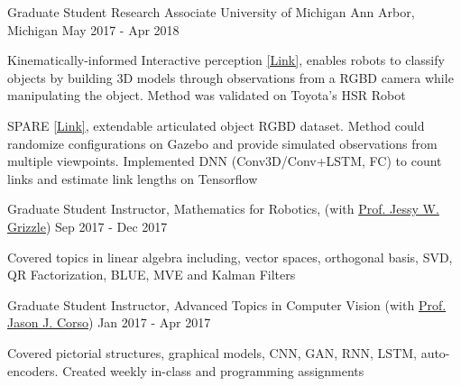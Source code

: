 

\begin{cventries2}
\cventry
{Graduate Student Research Associate} %
{University of Michigan} %
{Ann Arbor, Michigan} %
{May 2017 - Apr 2018} %
{
	\begin{cvitems} %
		\item {Kinematically-informed Interactive perception \href{https://arxiv.org/pdf/1901.05580}{[Link]}, enables robots to classify objects by building 3D models through observations from a RGBD camera while manipulating the object. Method was validated on Toyota’s HSR Robot}
		\vspace{0.1cm}
		\item SPARE {\href{https://arxiv.org/pdf/1803.11147}{[Link]}, extendable articulated object RGBD dataset. Method could randomize configurations on Gazebo and provide simulated observations from multiple viewpoints. Implemented DNN (Conv3D/Conv+LSTM, FC) to count links and estimate link lengths on Tensorflow}
	\end{cvitems}
}

\cventry
{Graduate Student Instructor, Mathematics for Robotics, (with \href{https://ece.umich.edu/faculty/grizzle/}{Prof. Jessy W. Grizzle})} %
{} %
{} %
{Sep 2017 - Dec 2017} %
{
	\begin{cvitems} %
		\item {Covered topics in linear algebra including, vector spaces, orthogonal basis, SVD, QR Factorization, BLUE, MVE and Kalman Filters}
	\end{cvitems}
}
\cventry
{Graduate Student Instructor, Advanced Topics in Computer Vision (with \href{https://web.eecs.umich.edu/~jjcorso/}{Prof. Jason J. Corso})} %
{} %
{} %
{Jan 2017 - Apr	 2017} %
{
	\begin{cvitems} %
		\item {Covered pictorial structures, graphical models, CNN, GAN, RNN, LSTM, auto-encoders. Created weekly in-class and programming assignments}
	\end{cvitems}
}      
\vspace{0.4cm}

\end{cventries2}    






